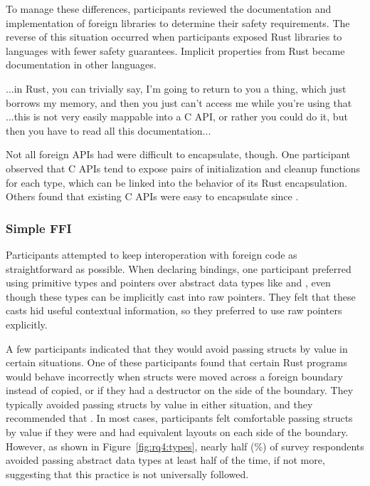 To manage these differences, participants reviewed the documentation and implementation of foreign libraries to determine their safety requirements. The reverse of this situation occurred when participants exposed Rust libraries to languages with fewer safety guarantees. Implicit properties from Rust became documentation in other languages. 
\begin{pquote}{13}
...in Rust, you can trivially say, I'm going to return to you a thing, which just borrows my memory, and then you just can't access me while you're using that
...this is not very easily mappable into a C API, or rather you could do it, but then you have to read all this documentation...
\end{pquote}
Not all foreign APIs had were difficult to encapsulate, though. One participant observed that C APIs tend to expose pairs of initialization and cleanup functions for each type, which can be linked into the behavior of its Rust encapsulation. Others found that existing C APIs were easy to encapsulate since .

\subsubsection{Simple FFI} Participants attempted to keep interoperation with foreign code as straightforward as possible. When declaring bindings, one participant preferred  using primitive types and pointers over abstract data types like  and , even though these types can be implicitly cast into raw pointers. They felt that these casts hid useful contextual information, so they preferred to use raw pointers explicitly.


A few participants indicated that they would avoid passing structs by value in certain situations. One of these participants found that certain Rust programs would behave incorrectly when structs were moved across a foreign boundary instead of copied, or if they had a destructor on the \CC{} side of the boundary. They typically avoided passing structs by value in either situation, and they recommended that . In most cases, participants felt comfortable passing structs by value if they were  and had equivalent layouts on each side of the boundary. However, as shown in Figure~\ref{fig:rq4:types}, nearly half (\avoidedadts\%) of survey respondents avoided passing abstract data types at least half of the time, if not more, suggesting that this practice is not universally followed.
 
